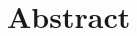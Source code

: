 \vspace*{1cm}
\chapter*{\centering\Large Abstract}

\begin{adjustwidth}{0cm}{0cm}


\end{adjustwidth}
